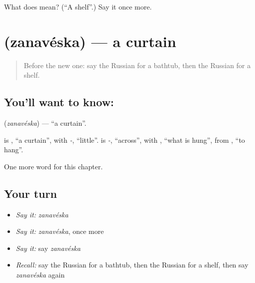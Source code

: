 \begin{tcolorbox}[breakable,colback=teal!4,colframe=teal!35!black,title={Before you move on}]
What does  mean? (\textquotedblleft{}A shelf\textquotedblright{}.) Say it once more.
\end{tcolorbox}
\section[\texorpdfstring{\ru{занавеска} (zanavéska)}{занавеска (zanavéska)}]{ (zanavéska) — a curtain}

\label{lesson:RU-C95-curtain}



\begin{quote}
Before the new one: say the Russian for a bathtub, then the Russian for a shelf.
\end{quote}

\subsection*{You'll want to know: }
\textbf{} (\emph{zanavéska}) — \textquotedblleft{}a curtain\textquotedblright{}.

\begin{cousinweb}
\textbf{} is \emph{}, \textquotedblleft{}a curtain\textquotedblright{}, with \emph{-}, \textquotedblleft{}little\textquotedblright{}. \emph{} is \emph{-}, \textquotedblleft{}across\textquotedblright{}, with \emph{}, \textquotedblleft{}what is hung\textquotedblright{}, from \emph{}, \textquotedblleft{}to hang\textquotedblright{}.
\end{cousinweb}

\begin{grammarlens}[title={What you've built}]
One more word for this chapter.
\end{grammarlens}

\subsection*{Your turn}
\begin{itemize}
\raggedright
  \item \emph{Say it:} \emph{zanavéska}
  \item \emph{Say it:} \emph{zanavéska}, once more
  \item \emph{Say it:} say \emph{zanavéska}
  \item \emph{Recall:} say the Russian for a bathtub, then the Russian for a shelf, then say \emph{zanavéska} again
\end{itemize}

